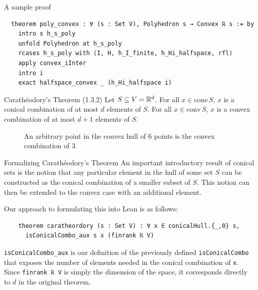\documentclass[final]{beamer}
\newlength{\colwidth}
\begin{document}
\begin{frame}[fragile]
\begin{columns}[t]
\begin{column}{\colwidth}
\vspace{1em}


            \begin{exampleblock}{A sample proof}
            \vspace{-0.5em}
\begin{Verbatim}
  theorem poly_convex : ∀ (s : Set V), Polyhedron s → Convex ℝ s := by
    intro s h_s_poly
    unfold Polyhedron at h_s_poly
    rcases h_s_poly with ⟨I, H, h_I_finite, h_Hi_halfspace, rfl⟩
    apply convex_iInter
    intro i
    exact halfspace_convex _ (h_Hi_halfspace i)
\end{Verbatim}
            \end{exampleblock}


            \begin{alertblock}{Carath\'eodory's Theorem (1.3.2)}
              Let $S \subseteq V = \mathbb{R}^d$. For all $x \in \text{cone}\,S$, $x$ is a conical combination of at most $d$ elements of $S$. For all $x \in \text{conv}\,S$, $x$ is a convex combination of at most $d + 1$ elements of $S$. 
            \end{alertblock}

            \begin{figure}[htbp]
                    \centering
                    
                    \caption{An arbitrary point in the convex hull of 6 points is the convex combination of 3.\label{fig:caratheodory}}
            \end{figure}

            \begin{block}{Formalizing Carath\'eodory's Theorem}
              An important introductory result of conical sets is the notion that any particular element in the hull of some set $S$ can be constructed as the conical combination of a smaller subset of $S$. This notion can then be extended to the convex case with an additional element.

              Our approach to formulating this into Lean is as follows:
\begin{Verbatim}
    theorem caratheordory (s : Set V) : ∀ x ∈ conicalHull.{_,0} s, 
      isConicalCombo_aux s x (finrank ℝ V) 
\end{Verbatim}
              \verb|isConicalCombo_aux| is our definition of the previously defined \verb|isConicalCombo| that exposes the number of elements needed in the conical combination of \verb|x|. Since \verb|finrank ℝ V| is simply the dimension of the space, it corresponds directly to $d$ in the original theorem.


\end{block}
\end{column}
\end{columns}
\end{frame}
\end{document}
